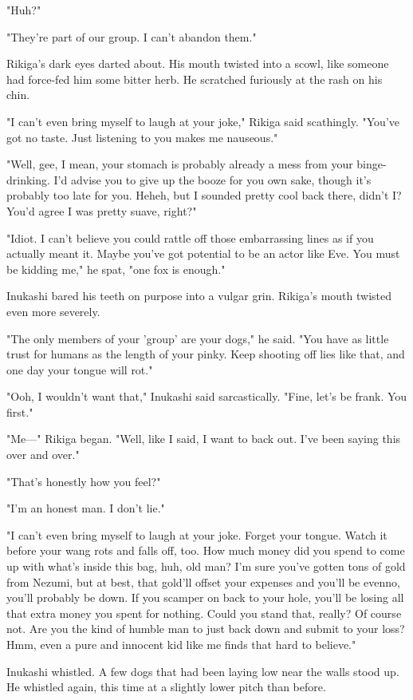 "Huh?"

"They're part of our group. I can't abandon them."

Rikiga's dark eyes darted about. His mouth twisted into a scowl, like
someone had force-fed him some bitter herb. He scratched furiously at
the rash on his chin.

"I can't even bring myself to laugh at your joke," Rikiga said
scathingly. "You've got no taste. Just listening to you makes me
nauseous."

"Well, gee, I mean, your stomach is probably already a mess from your
binge-drinking. I'd advise you to give up the booze for you own sake,
though it's probably too late for you. Heheh, but I sounded pretty cool
back there, didn't I? You'd agree I was pretty suave, right?"

"Idiot. I can't believe you could rattle off those embarrassing lines as
if you actually meant it. Maybe you've got potential to be an actor like
Eve. You must be kidding me," he spat, "one fox is enough."

Inukashi bared his teeth on purpose into a vulgar grin. Rikiga's mouth
twisted even more severely.

"The only members of your 'group' are your dogs," he said. "You have as
little trust for humans as the length of your pinky. Keep shooting off
lies like that, and one day your tongue will rot."

"Ooh, I wouldn't want that," Inukashi said sarcastically. "Fine, let's
be frank. You first."

"Me---" Rikiga began. "Well, like I said, I want to back out. I've been
saying this over and over."

"That's honestly how you feel?"

"I'm an honest man. I don't lie."

"I can't even bring myself to laugh at your joke. Forget your tongue.
Watch it before your wang rots and falls off, too. How much money did
you spend to come up with what's inside this bag, huh, old man? I'm sure
you've gotten tons of gold from Nezumi, but at best, that gold'll offset
your expenses and you'll be even\el no, you'll probably be down. If you
scamper on back to your hole, you'll be losing all that extra money you
spent for nothing. Could you stand that, really? Of course not. Are you
the kind of humble man to just back down and submit to your loss? Hmm,
even a pure and innocent kid like me finds that hard to believe."

Inukashi whistled. A few dogs that had been laying low near the walls
stood up. He whistled again, this time at a slightly lower pitch than
before.

